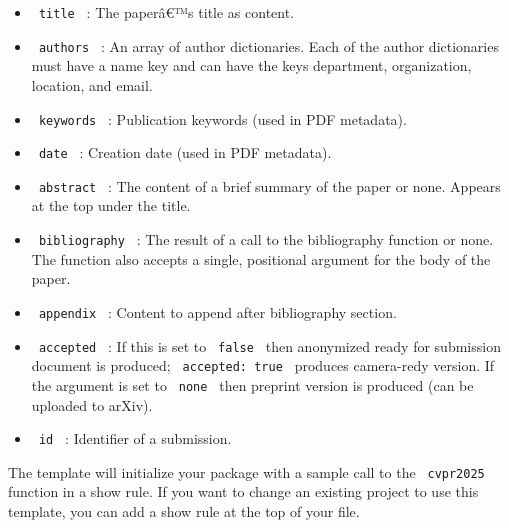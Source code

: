 \begin{itemize}
\tightlist
\item
  \texttt{\ title\ } : The paperâ€™s title as content.
\item
  \texttt{\ authors\ } : An array of author dictionaries. Each of the
  author dictionaries must have a name key and can have the keys
  department, organization, location, and email.
\item
  \texttt{\ keywords\ } : Publication keywords (used in PDF metadata).
\item
  \texttt{\ date\ } : Creation date (used in PDF metadata).
\item
  \texttt{\ abstract\ } : The content of a brief summary of the paper or
  none. Appears at the top under the title.
\item
  \texttt{\ bibliography\ } : The result of a call to the bibliography
  function or none. The function also accepts a single, positional
  argument for the body of the paper.
\item
  \texttt{\ appendix\ } : Content to append after bibliography section.
\item
  \texttt{\ accepted\ } : If this is set to \texttt{\ false\ } then
  anonymized ready for submission document is produced;
  \texttt{\ accepted:\ true\ } produces camera-redy version. If the
  argument is set to \texttt{\ none\ } then preprint version is produced
  (can be uploaded to arXiv).
\item
  \texttt{\ id\ } : Identifier of a submission.
\end{itemize}

The template will initialize your package with a sample call to the
\texttt{\ cvpr2025\ } function in a show rule. If you want to change an
existing project to use this template, you can add a show rule at the
top of your file.

\begin{Shaded}
\begin{Highlighting}[]

\NormalTok{  abstract: [}
\NormalTok{  ],}
\NormalTok{)}
\end{Highlighting}
\end{Shaded}

